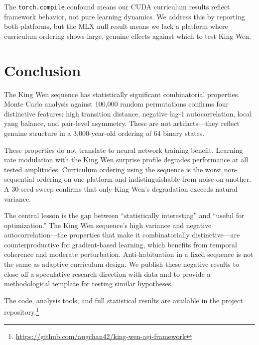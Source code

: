 \documentclass{article}
\begin{document}
The \texttt{torch.compile} confound means our CUDA curriculum results reflect framework behavior, not pure learning dynamics. We address this by reporting both platforms, but the MLX null result means we lack a platform where curriculum ordering shows large, genuine effects against which to test King Wen.

\section{Conclusion}\label{sec:conclusion}

The King Wen sequence has statistically significant combinatorial properties. Monte Carlo analysis against 100,000 random permutations confirms four distinctive features: high transition distance, negative lag-1 autocorrelation, local yang balance, and pair-level asymmetry. These are not artifacts---they reflect genuine structure in a 3,000-year-old ordering of 64 binary states.

These properties do not translate to neural network training benefit. Learning rate modulation with the King Wen surprise profile degrades performance at all tested amplitudes. Curriculum ordering using the sequence is the worst non-sequential ordering on one platform and indistinguishable from noise on another. A 30-seed sweep confirms that only King Wen's degradation exceeds natural variance.

The central lesson is the gap between ``statistically interesting'' and ``useful for optimization.'' The King Wen sequence's high variance and negative autocorrelation---the properties that make it combinatorially distinctive---are counterproductive for gradient-based learning, which benefits from temporal coherence and moderate perturbation. Anti-habituation in a fixed sequence is not the same as adaptive curriculum design. We publish these negative results to close off a speculative research direction with data and to provide a methodological template for testing similar hypotheses.

The code, analysis tools, and full statistical results are available in the project repository.\footnote{\url{https://github.com/augchan42/king-wen-agi-framework}}




\newpage
\end{document}

